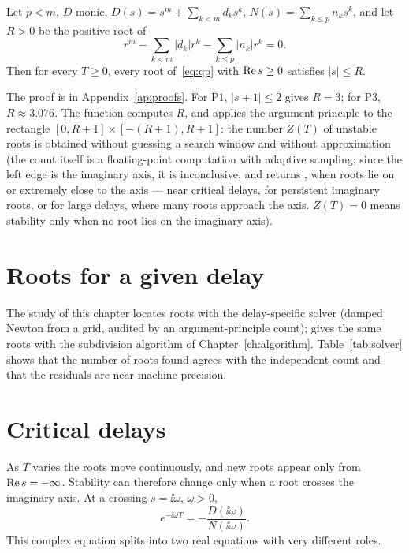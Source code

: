 \begin{proposition}\label{prop:bound}
Let $p<m$, $D$ monic, $D(s)=s^m+\sum_{k<m}d_ks^k$, $N(s)=\sum_{k\le p}n_ks^k$,
and let $R>0$ be the positive root of
\[
  r^m-\sum_{k<m}|d_k|r^k-\sum_{k\le p}|n_k|r^k=0 .
\]
Then for every $T\ge0$, every root of~\eqref{eq:qp} with $\operatorname{Re} s\ge0$
satisfies $|s|\le R$.
\end{proposition}
The proof is in Appendix~\ref{ap:proofs}. For P1, $|s+1|\le2$ gives $R=3$;
for P3, $R\approx3.076$. The function  computes $R$,
and  applies the argument principle to the
rectangle $[0,R+1]\times[-(R+1),R+1]$: the number $Z(T)$ of unstable roots
is obtained without guessing a search window and without approximation
(the count itself is a floating-point computation with adaptive sampling;
since the left edge is the imaginary axis, it is inconclusive, and returns
, when roots lie on or extremely close to the axis --- near
critical delays, for persistent imaginary roots, or for large delays, where
many roots approach the axis. $Z(T)=0$ means stability only when no root
lies on the imaginary axis).

\section{Roots for a given delay}

The study of this chapter locates roots with the delay-specific solver
 (damped Newton from a grid, audited by an
argument-principle count);  gives the same roots with the
subdivision algorithm of Chapter~\ref{ch:algorithm}. Table~\ref{tab:solver}
shows that the number of roots found agrees with the independent count and
that the residuals are near machine precision.



\section{Critical delays}

As $T$ varies the roots move continuously, and new roots appear only from
$\operatorname{Re} s=-\infty$. Stability can therefore change only when a root crosses
the imaginary axis. At a crossing $s=\ii\omega$, $\omega>0$,
\begin{equation}
  e^{-\ii\omega T}=-\frac{D(\ii\omega)}{N(\ii\omega)} .
  \label{eq:crossing}
\end{equation}
This complex equation splits into two real equations with very different
roles.

